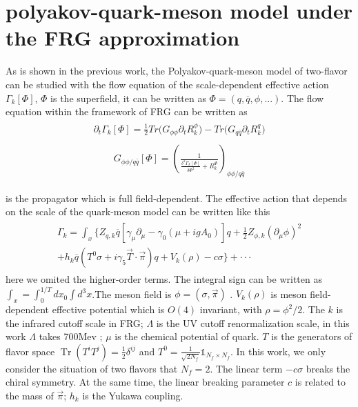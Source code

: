 \documentclass[%
reprint,
superscriptaddress,
showpacs,preprintnumbers,
 amsmath,amssymb,
 aps,
prd,
]{revtex4-1}
\newcommand{\Tr}{\ensuremath{\operatorname{Tr}}}
\begin{document}



\section{polyakov-quark-meson model under the FRG approximation}
As is shown in the previous work, the Polyakov-quark-meson model of two-flavor can be studied with the flow equation of the 
scale-dependent effective action 
$\Gamma_k[\Phi]$, $\Phi$ is the superfield, it can be written as
 $\Phi=(q,\overline{q},\phi,...)$.  The flow equation within the framework of FRG can be written as
\begin{align}\label{fqm}
\begin{split}
\partial_t\Gamma_k[\Phi]=\frac{1}{2}Tr\big(G_{\phi\phi}\partial_tR^{\phi}_{k}\big)-Tr\big(G_{q\bar{q}}\partial_tR^{q}_{k}\big)
\end{split}
\end{align}
\begin{align}\label{cqm}
\begin{split}
G_{\phi\phi/q\bar{q}}[\Phi]=\left( \frac{1}{\frac{\delta^2\Gamma_k[\Phi]}{\delta\Phi^2}+R^{\Phi}_{k}} \right)_{\phi\phi/
q\bar{q}}
\end{split}
\end{align}

is the propagator which is full field-dependent.
The effective action that depends on the scale of the quark-meson model can be written like this
\begin{align}
\begin{split}
\Gamma_k=\int_x\big\{Z_{q,k}\overline{q} [\gamma_\mu \partial_\mu -\gamma_0(\mu+igA_0) ]q+\frac{1}{2}Z_{\phi,k}
(\partial_\mu \phi)^2\\+h_k\overline{q}
(T^0\sigma+i\gamma_5\vec{T}\cdot \vec{\pi})q+V_k(\rho)-c\sigma \big\}+\cdot\cdot\cdot\label{eq:effact}
\end{split}
\end{align}
here we omited the higher-order terms. The integral sign can be written as $\int_x=\int_0^{1/T}dx_0\int d^3x$.The meson 
field is $\phi=\left(\sigma,\vec{\pi}
\right)$ . 
$V_k(\rho)$ is meson field-dependent effective potential which is $O(4)$ invariant, with $\rho=\phi^2/2$. The $k$ is the infrared 
cutoff scale in FRG; $\Lambda$ is the UV cutoff renormalization scale, in this work $\Lambda$ takes 700Mev ; $\mu$ is the chemical 
potential of quark. $T$ is the generators of flavor space $\Tr(T^{i}T^{j})=\frac{1}{2}\delta^{ij}$ and
$T^{0}=\frac{1}{\sqrt{2N_{f}}}\mathbb{1}_{N_{f}\times N_{f}}$. In this work, we only consider the situation of two flavors that $N_f=2$. 
The linear term $-c\sigma$ breaks the chiral symmetry. At 
the same time, the linear breaking 
parameter $c$ is related to the mass of $\vec{\pi}$; $h_k$ is the Yukawa coupling. \\
\end{document}
